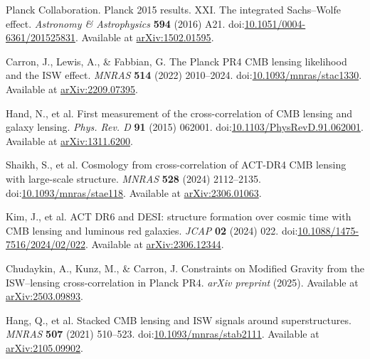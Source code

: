 \documentclass[11pt]{article}
\begin{document}
\begin{thebibliography}{99}

Planck Collaboration.
Planck 2015 results. XXI. The integrated Sachs--Wolfe effect.
\textit{Astronomy \& Astrophysics} \textbf{594} (2016) A21.
doi:\href{https://doi.org/10.1051/0004-6361/201525831}{10.1051/0004-6361/201525831}.
Available at \href{https://arxiv.org/abs/1502.01595}{arXiv:1502.01595}.

Carron, J., Lewis, A., \& Fabbian, G.
The Planck PR4 CMB lensing likelihood and the ISW effect.
\textit{MNRAS} \textbf{514} (2022) 2010--2024.
doi:\href{https://doi.org/10.1093/mnras/stac1330}{10.1093/mnras/stac1330}.
Available at \href{https://arxiv.org/abs/2209.07395}{arXiv:2209.07395}.

Hand, N., et al.
First measurement of the cross-correlation of CMB lensing and galaxy lensing.
\textit{Phys. Rev. D} \textbf{91} (2015) 062001.
doi:\href{https://doi.org/10.1103/PhysRevD.91.062001}{10.1103/PhysRevD.91.062001}.
Available at \href{https://arxiv.org/abs/1311.6200}{arXiv:1311.6200}.

Shaikh, S., et al.
Cosmology from cross-correlation of ACT-DR4 CMB lensing with large-scale structure.
\textit{MNRAS} \textbf{528} (2024) 2112--2135.
doi:\href{https://doi.org/10.1093/mnras/stae118}{10.1093/mnras/stae118}.
Available at \href{https://arxiv.org/abs/2306.01063}{arXiv:2306.01063}.

Kim, J., et al.
ACT DR6 and DESI: structure formation over cosmic time with CMB lensing and luminous red galaxies.
\textit{JCAP} \textbf{02} (2024) 022.
doi:\href{https://doi.org/10.1088/1475-7516/2024/02/022}{10.1088/1475-7516/2024/02/022}.
Available at \href{https://arxiv.org/abs/2306.12344}{arXiv:2306.12344}.

Chudaykin, A., Kunz, M., \& Carron, J.
Constraints on Modified Gravity from the ISW--lensing cross-correlation in Planck PR4.
\textit{arXiv preprint} (2025).
Available at \href{https://arxiv.org/abs/2503.09893}{arXiv:2503.09893}.

Hang, Q., et al.
Stacked CMB lensing and ISW signals around superstructures.
\textit{MNRAS} \textbf{507} (2021) 510--523.
doi:\href{https://doi.org/10.1093/mnras/stab2111}{10.1093/mnras/stab2111}.
Available at \href{https://arxiv.org/abs/2105.09902}{arXiv:2105.09902}.

\end{thebibliography}
\end{document}
